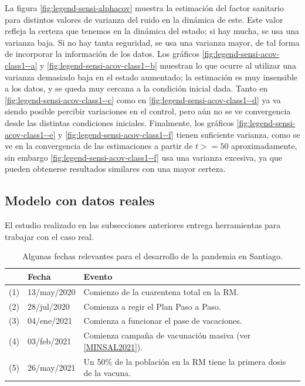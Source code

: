La figura \ref{fig:legend-sensi-alphacov} muestra la estimación del factor sanitario para distintos valores de varianza del ruido en la dinámica de este. Este valor refleja la certeza que tenemos en la dinámica del estado; si hay mucha, se usa una varianza baja. Si no hay tanta seguridad, se usa una varianza mayor, de tal forma de incorporar la información de los datos. Los gráficos  \ref{fig:legend-sensi-acov-class1--a} y \ref{fig:legend-sensi-acov-class1--b}  muestran lo que ocurre al utilizar una varianza demasiado baja en el estado aumentado; la estimación es muy insensible a los datos, y se queda muy cercana a la condición inicial dada. Tanto en \ref{fig:legend-sensi-acov-class1--c} como en \ref{fig:legend-sensi-acov-class1--d} ya va siendo posible percibir variaciones en el control, pero aún no se ve convergencia desde las distintas condiciones iniciales. Finalmente, los gráficos  \ref{fig:legend-sensi-acov-class1--e} y \ref{fig:legend-sensi-acov-class1--f} tienen suficiente varianza, como se ve en la convergencia de las estimaciones a partir de \(t >=50\) aproximadamente, sin embargo \ref{fig:legend-sensi-acov-class1--f} usa una varianza excesiva, ya que pueden obtenerse resultados similares con una mayor certeza.




\subsection{Modelo con datos reales}\label{subsec:datosreales}

El estudio realizado en las subsecciones anteriores entrega herramientas para trabajar con el caso real.



\begin{table}[h!]
\centering
\begin{tabular}{|| m{1cm} m{3cm} m{8cm}||} 
 \hline
 & \textbf{Fecha} & \textbf{Evento} \\
 \hline 
 (1) & 13/may/2020 & Comienzo de la cuarentena total en la RM.\\
 (2) & 28/jul/2020 & Comienza a regir el Plan Paso a Paso.\\
 (3) & 04/ene/2021 & Comienza a funcionar el pase de vacaciones.\\ 
 (4) & 03/feb/2021 & Comienza campaña de vacunación masiva (ver \ref{MINSAL2021}).\\
 (5) & 26/may/2021 &  Un 50\% de la población en la RM tiene la primera dosis de la vacuna. \\
 \hline
\end{tabular}
\caption{Algunas fechas relevantes para el desarrollo de la pandemia en Santiago.}
\label{table:fechas-relevantes}
\end{table}


